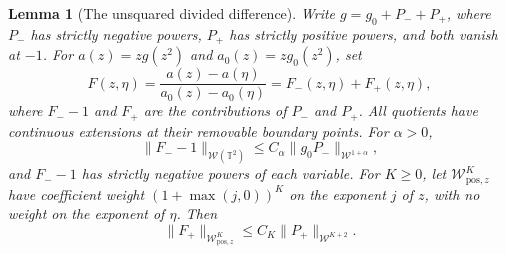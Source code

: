 \documentclass[11pt]{article}
\newtheorem{lemma}[proposition]{Lemma}
\newcommand{\T}{\mathbb T}
\begin{document}
\begin{lemma}[The unsquared divided difference]
\label{lem:unsquared-divided-difference}
Write $g=g_0+P_-+P_+$, where $P_-$ has strictly negative powers,
$P_+$ has strictly positive powers, and both vanish at $-1$.
For $a(z)=zg(z^2)$ and $a_0(z)=zg_0(z^2)$, set
\[
 F(z,\eta)=\frac{a(z)-a(\eta)}{a_0(z)-a_0(\eta)}
          =F_-(z,\eta)+F_+(z,\eta),
\]
where $F_--1$ and $F_+$ are the contributions of $P_-$ and $P_+$.
All quotients have continuous extensions at their removable boundary
points. For $\alpha>0$,
\[
 \|F_--1\|_{\mathcal W(\T^2)}
       \le C_\alpha\|g_0P_-\|_{\mathcal W^{1+\alpha}},
\]
and $F_--1$ has strictly negative powers of each variable.
For $K\ge0$, let $\mathcal W_{\mathrm{pos},z}^K$ have coefficient
weight $(1+\max(j,0))^K$ on the exponent $j$ of $z$, with no
weight on the exponent of $\eta$. Then
\[
 \|F_+\|_{\mathcal W_{\mathrm{pos},z}^K}
       \le C_K\|P_+\|_{\mathcal W^{K+2}}.
\]
\end{lemma}
\end{document}
